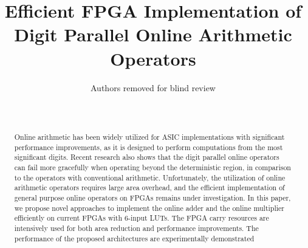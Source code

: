 \documentclass[conference]{IEEEtran}
\begin{document}
\title{Efficient FPGA Implementation of\\ Digit Parallel Online Arithmetic Operators}


\author{Authors removed for blind review\\ \\ \\}

\maketitle


\begin{abstract}
Online arithmetic has been widely utilized for ASIC implementations with significant performance improvements, as it is designed to perform computations from the most significant digits. Recent research also shows that the digit parallel online operators can fail more gracefully when operating beyond the deterministic region, in comparison to the operators with conventional arithmetic. Unfortunately, the utilization of online arithmetic operators requires large area overhead, and the efficient implementation of general purpose online operators on FPGAs remains under investigation. In this paper, we propose novel approaches to implement the online adder and the online multiplier efficiently on current FPGAs with 6-input LUTs. The FPGA carry resources are intensively used for both area reduction and performance improvements. The performance of the proposed architectures are experimentally demonstrated 



 
\end{abstract}


%
\end{document}
